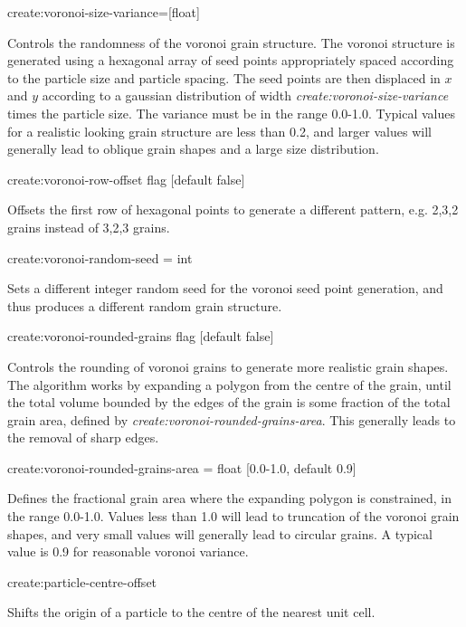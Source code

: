{\zicf create:voronoi-size-variance=[float]} Controls the randomness of the voronoi grain structure. The voronoi structure is generated using a hexagonal array of seed points appropriately spaced according to the particle size and particle spacing. The seed points are then displaced in $x$ and $y$ according to a gaussian distribution of width \textit{create:voronoi-size-variance} times the particle size. The variance must be in the range 0.0-1.0. Typical values for a realistic looking grain structure are less than 0.2, and larger values will generally lead to oblique grain shapes and a large size distribution.

{\zicf create:voronoi-row-offset flag [default false]} Offsets the first row of hexagonal points to generate a different pattern, e.g. 2,3,2 grains instead of 3,2,3 grains.

{\zicf create:voronoi-random-seed = int} Sets a different integer random seed for the voronoi seed point generation, and thus produces a different random grain structure.

{\zicf create:voronoi-rounded-grains flag [default false]} Controls the rounding of voronoi grains to generate more realistic grain shapes. The algorithm works by expanding a polygon from the centre of the grain, until the total volume bounded by the edges of the grain is some fraction of the total grain area, defined by \textit{create:voronoi-rounded-grains-area}. This generally leads to the removal of sharp edges.

{\zicf create:voronoi-rounded-grains-area = float [0.0-1.0, default 0.9]} Defines the fractional grain area where the expanding polygon is constrained, in the range 0.0-1.0. Values less than 1.0 will lead to truncation of the voronoi grain shapes, and very small values will generally lead to circular grains. A typical value is 0.9 for reasonable voronoi variance.

{\zicf create:particle-centre-offset} Shifts the origin of a particle to the centre of the nearest unit cell.

